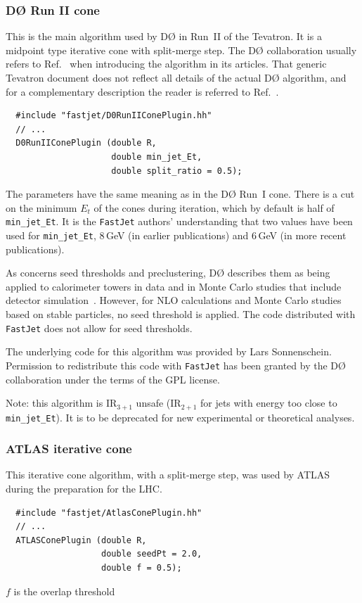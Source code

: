 \documentclass[12pt,a4]{article}
\newcommand{\fastjet}{\texttt{FastJet}\xspace}
\newcommand{\Dzero}{D\O\xspace}
\begin{document}
\subsubsection{\Dzero Run II cone}
%
This is the main algorithm used by \Dzero in Run~II of the
Tevatron. It is a midpoint type iterative cone with split-merge step.
%
The \Dzero collaboration usually refers to
Ref.~\cite{RunII-jet-physics} when introducing the algorithm in its
articles.
%
That generic Tevatron document does not reflect all details of the
actual \Dzero algorithm, and for a complementary description
%
the reader is referred to Ref.~\cite{arXiv:1110.3771}.
\begin{lstlisting}
  #include "fastjet/D0RunIIConePlugin.hh"
  // ...
  D0RunIIConePlugin (double R, 
                     double min_jet_Et, 
                     double split_ratio = 0.5);
\end{lstlisting}
The parameters have the same meaning as in the \Dzero Run~I
cone. 
%
There is a cut on the minimum $E_t$ of the cones during iteration,
which by default is half of \verb|min_jet_Et|.
%
It is the \fastjet authors' understanding that two values have been
used for \verb|min_jet_Et|, 8\,GeV (in earlier publications) and
6\,GeV (in more recent publications).

As concerns seed thresholds and preclustering, \Dzero describes them
as being applied to calorimeter towers in data and in Monte Carlo studies
that include detector simulation~\cite{arXiv:1110.3771}.
%
However, for NLO calculations and Monte Carlo studies based on stable
particles, no seed threshold is applied.
%
The code distributed with \fastjet does not allow for seed thresholds.

The underlying code for this algorithm was provided by
Lars Sonnenschein.
%
Permission to redistribute this code with \fastjet has been granted by
the \Dzero collaboration under the terms of the GPL license.

Note: this algorithm is IR$_{3+1}$ unsafe (IR$_{2+1}$ for jets with
energy too close to \verb:min_jet_Et:). It is to be deprecated for new
experimental or theoretical analyses.

\subsubsection{ATLAS iterative cone}
%
This iterative cone algorithm, with a split-merge step, was used by
ATLAS during the preparation for the LHC.
\begin{lstlisting}
  #include "fastjet/AtlasConePlugin.hh"
  // ...
  ATLASConePlugin (double R, 
                   double seedPt = 2.0, 
                   double f = 0.5);
\end{lstlisting}
$f$ is the overlap threshold
\end{document}
